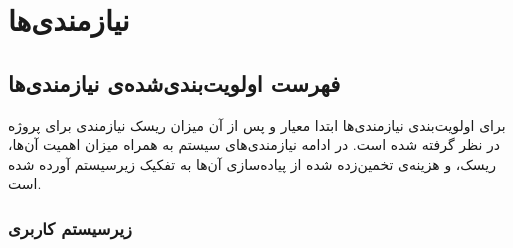 \chapter{نیازمندی‌ها}



\section{فهرست اولویت‌بندی‌شده‌ی نیازمندی‌ها}


 برای اولویت‌بندی نیازمندی‌ها ابتدا معیار 
و پس از آن میزان ریسک نیازمندی برای پروژه در نظر گرفته شده است. 
در ادامه نیازمندی‌های سیستم به همراه میزان اهمیت آن‌ها، ریسک، و هزینه‌ی تخمین‌زده شده از پیاده‌سازی آن‌ها به تفکیک زیرسیستم آورده شده است.

\subsection{زیرسیستم کاربری}

